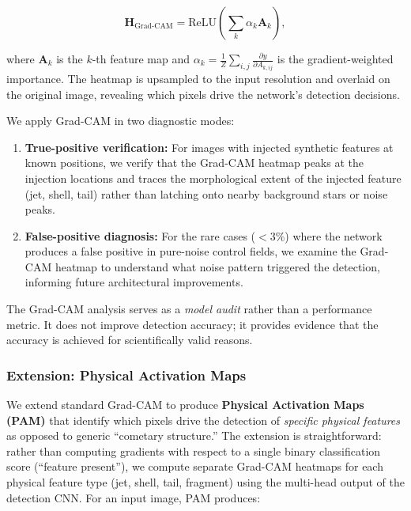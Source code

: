 \documentclass[usenatbib]{mnras}
\begin{document}
\begin{equation}\label{eq:gradcam}
\mathbf{H}_{\text{Grad-CAM}} = \text{ReLU}\left(\sum_k \alpha_k \mathbf{A}_k\right),
\end{equation}

where $\mathbf{A}_k$ is the $k$-th feature map and $\alpha_k = \frac{1}{Z}\sum_{i,j}\frac{\partial y}{\partial A_{k,ij}}$ is the gradient-weighted importance. The heatmap is upsampled to the input resolution and overlaid on the original image, revealing which pixels drive the network's detection decisions.

We apply Grad-CAM in two diagnostic modes:

\begin{enumerate}
    \item \textbf{True-positive verification:} For images with injected synthetic features at known positions, we verify that the Grad-CAM heatmap peaks at the injection locations and traces the morphological extent of the injected feature (jet, shell, tail) rather than latching onto nearby background stars or noise peaks.
    \item \textbf{False-positive diagnosis:} For the rare cases ($<3\%$) where the network produces a false positive in pure-noise control fields, we examine the Grad-CAM heatmap to understand what noise pattern triggered the detection, informing future architectural improvements.
\end{enumerate}

The Grad-CAM analysis serves as a \textit{model audit} rather than a performance metric. It does not improve detection accuracy; it provides evidence that the accuracy is achieved for scientifically valid reasons.

\subsubsection{Extension: Physical Activation Maps}

We extend standard Grad-CAM to produce \textbf{Physical Activation Maps (PAM)} that identify which pixels drive the detection of \textit{specific physical features} as opposed to generic ``cometary structure.'' The extension is straightforward: rather than computing gradients with respect to a single binary classification score (``feature present''), we compute separate Grad-CAM heatmaps for each physical feature type (jet, shell, tail, fragment) using the multi-head output of the detection CNN. For an input image, PAM produces:
\end{document}
